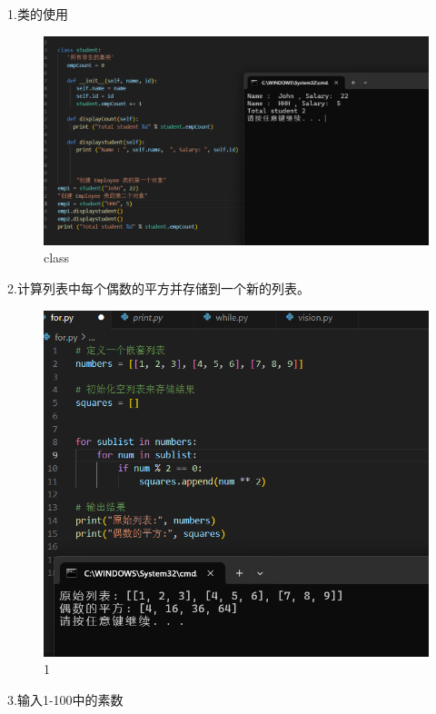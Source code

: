 \documentclass[a4paper, 12pt]{article}
\begin{document}
\noindent 1.类的使用
 \begin{figure}[H]
  \centering
  \includegraphics[width=1\textwidth]{屏幕截图 2024-09-12 120300.png}
  \caption{class}
    \end{figure}

\noindent 2.计算列表中每个偶数的平方并存储到一个新的列表。
\begin{figure}[H]
  \centering
  \includegraphics[width=1\textwidth]{屏幕截图 2024-09-06 105912.png}
  \caption{1}
    \end{figure}

3.输入1-100中的素数
\end{document}
